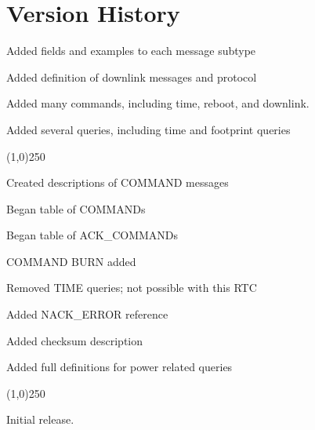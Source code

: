 \documentclass{article}
\begin{document}
\newpage
\section{Version History}


Added fields and examples to each message subtype

Added definition of downlink messages and protocol

Added many commands, including time, reboot, and downlink.

Added several queries, including time and footprint queries

\noindent\line(1,0){250}


Created descriptions of COMMAND messages

Began table of COMMANDs

Began table of ACK\_COMMANDs

COMMAND BURN added

Removed TIME queries; not possible with this RTC

Added NACK\_ERROR reference

Added checksum description

Added full definitions for power related queries

\noindent\line(1,0){250}


Initial release.

    
\end{document}
